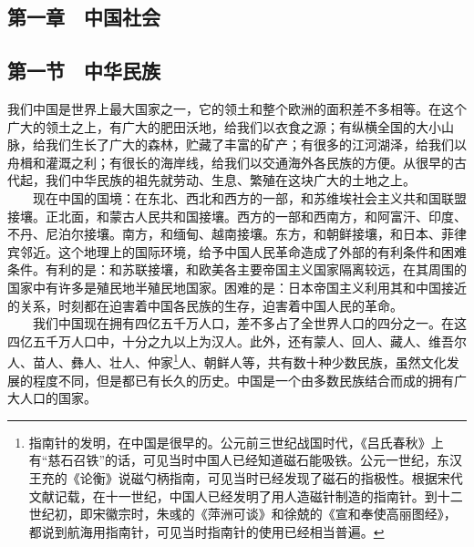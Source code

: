 \documentclass[cn,11pt,chinese]{elegantbook}
\def\myformat#1{\hfil\hfil #1}
\begin{document}
\subsection*{\myformat{第一章　中国社会}}
\subsection*{\myformat{第一节　中华民族}}
我们中国是世界上最大国家之一，它的领土和整个欧洲的面积差不多相等。在这个广大的领土之上，有广大的肥田沃地，给我们以衣食之源；有纵横全国的大小山脉，给我们生长了广大的森林，贮藏了丰富的矿产；有很多的江河湖泽，给我们以舟楫和灌溉之利；有很长的海岸线，给我们以交通海外各民族的方便。从很早的古代起，我们中华民族的祖先就劳动、生息、繁殖在这块广大的土地之上。\\
　　现在中国的国境：在东北、西北和西方的一部，和苏维埃社会主义共和国联盟接壤。正北面，和蒙古人民共和国接壤。西方的一部和西南方，和阿富汗、印度、不丹、尼泊尔接壤。南方，和缅甸、越南接壤。东方，和朝鲜接壤，和日本、菲律宾邻近。这个地理上的国际环境，给予中国人民革命造成了外部的有利条件和困难条件。有利的是：和苏联接壤，和欧美各主要帝国主义国家隔离较远，在其周围的国家中有许多是殖民地半殖民地国家。困难的是：日本帝国主义利用其和中国接近的关系，时刻都在迫害着中国各民族的生存，迫害着中国人民的革命。\\
　　我们中国现在拥有四亿五千万人口，差不多占了全世界人口的四分之一。在这四亿五千万人口中，十分之九以上为汉人。此外，还有蒙人、回人、藏人、维吾尔人、苗人、彝人、壮人、仲家\footnote[1]{ 指南针的发明，在中国是很早的。公元前三世纪战国时代，《吕氏春秋》上有“慈石召铁”的话，可见当时中国人已经知道磁石能吸铁。公元一世纪，东汉王充的《论衡》说磁勺柄指南，可见当时已经发现了磁石的指极性。根据宋代文献记载，在十一世纪，中国人已经发明了用人造磁针制造的指南针。到十二世纪初，即宋徽宗时，朱彧的《萍洲可谈》和徐兢的《宣和奉使高丽图经》，都说到航海用指南针，可见当时指南针的使用已经相当普遍。}人、朝鲜人等，共有数十种少数民族，虽然文化发展的程度不同，但是都已有长久的历史。中国是一个由多数民族结合而成的拥有广大人口的国家。\\
\end{document}
